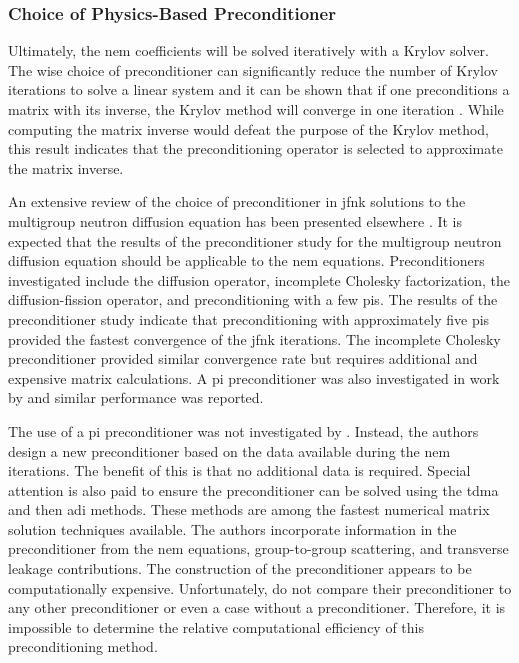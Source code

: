     \subsubsection{Choice of Physics-Based Preconditioner}

      Ultimately, the \gls{nem} coefficients will be solved iteratively with a
      Krylov solver. The wise choice of preconditioner can significantly reduce 
      the number of Krylov iterations to solve a linear system and it can be
      shown that if one preconditions a matrix with its inverse, the Krylov
      method will converge in one iteration \cite{textbookkelley}. While
      computing the matrix inverse would defeat the purpose of the Krylov
      method, this result indicates that the preconditioning operator is
      selected to approximate the matrix inverse.

      An extensive review of the choice of preconditioner in \gls{jfnk}
      solutions to the multigroup neutron diffusion equation has been presented
      elsewhere \cite{gill_azmy}. It is expected that the results of the
      preconditioner study for the multigroup neutron diffusion equation should
      be applicable to the \gls{nem} equations. Preconditioners investigated
      include the diffusion operator, incomplete Cholesky factorization, the
      diffusion-fission operator, and preconditioning with a few \glspl{pi}. The
      results of the preconditioner study indicate that preconditioning with
      approximately five \glspl{pi} provided the fastest convergence of the
      \gls{jfnk} iterations. The incomplete Cholesky preconditioner provided
      similar convergence rate but requires additional and expensive matrix
      calculations. A \gls{pi} preconditioner was also investigated in work by
      \citeauthor{jfnk_wielandt} and similar performance was reported.

      The use of a \gls{pi} preconditioner was not investigated by
      \citeauthor{qe2paper}. Instead, the authors design a new
      preconditioner based on the data available during the \gls{nem}
      iterations. The benefit of this is that no additional data is required.
      Special attention is also paid to ensure the preconditioner can be solved
      using the \gls{tdma} and then \gls{adi} methods. These methods are among
      the fastest numerical matrix solution techniques available. The authors
      incorporate information in the preconditioner from the \gls{nem}
      equations, group-to-group scattering, and transverse leakage
      contributions. The construction of the preconditioner appears to be 
      computationally expensive. Unfortunately, \citeauthor{qe2paper} do not
      compare their preconditioner to any other preconditioner or even a case
      without a preconditioner. Therefore, it is impossible to determine the
      relative computational efficiency of this preconditioning method.

